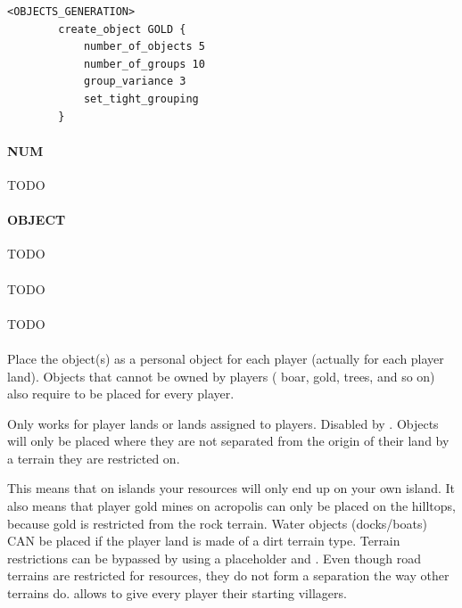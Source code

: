     \begin{lstlisting}[language={rms}, label={lst:groupvariance}, caption={Example showing how you can create different groups of object in the whole map, with different number of objects in each group.}]
        <OBJECTS_GENERATION>
        create_object GOLD {
            number_of_objects 5
            number_of_groups 10
            group_variance 3
            set_tight_grouping
        }
    \end{lstlisting}

    \paragraph{ NUM}

    TODO

    \paragraph{ OBJECT}

    TODO

    \paragraph{}

    TODO 

    \paragraph{}

    TODO

    \paragraph{}

    Place the object(s) as a personal object for each player (actually for each player land). Objects that cannot be owned by players (\eg{} boar, gold, trees, and so on) also require  to be placed for every player.

    Only works for player lands or lands assigned to players. Disabled by . Objects will only be placed where they are not separated from the origin of their land by a terrain they are restricted on.

    This means that on islands your resources will only end up on your own island. It also means that player gold mines on acropolis can only be placed on the hilltops, because gold is restricted from the rock terrain. Water objects (docks/boats) CAN be placed if the player land is made of a dirt terrain type. Terrain restrictions can be bypassed by using a placeholder and . Even though road terrains are restricted for resources, they do not form a separation the way other terrains do.  allows to give every player their starting villagers.

